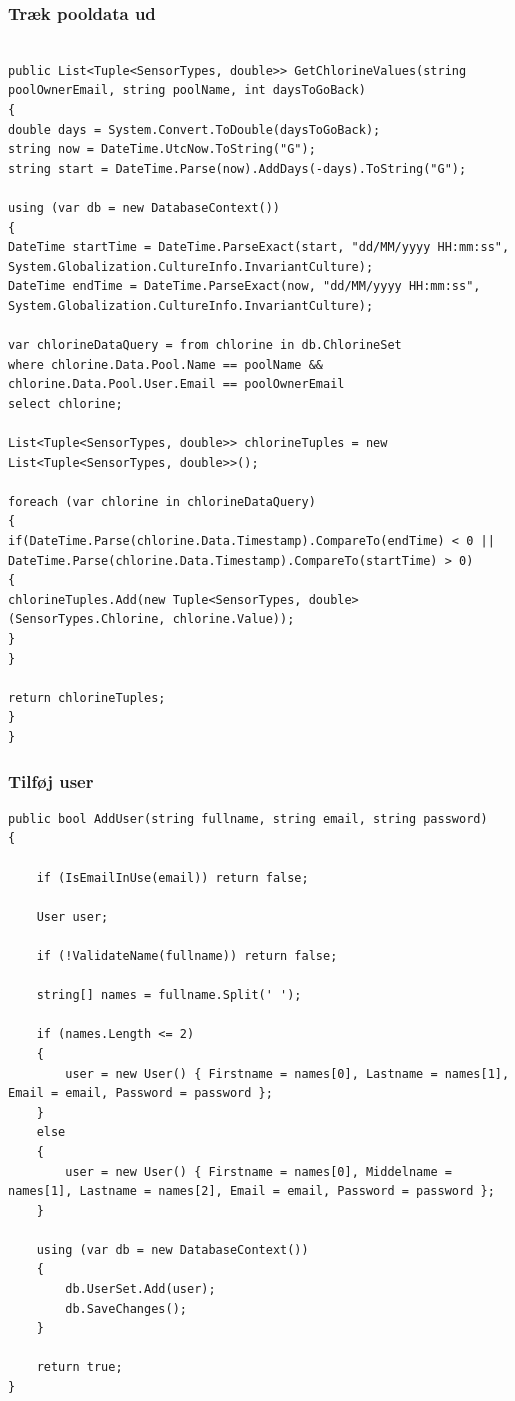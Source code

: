 \subsubsection{Træk pooldata ud}

\begin{lstlisting}[caption= GetChlorineData method, label=code:getChlorineData]

public List<Tuple<SensorTypes, double>> GetChlorineValues(string poolOwnerEmail, string poolName, int daysToGoBack)
{
double days = System.Convert.ToDouble(daysToGoBack);
string now = DateTime.UtcNow.ToString("G");
string start = DateTime.Parse(now).AddDays(-days).ToString("G");

using (var db = new DatabaseContext())
{   
DateTime startTime = DateTime.ParseExact(start, "dd/MM/yyyy HH:mm:ss", System.Globalization.CultureInfo.InvariantCulture);
DateTime endTime = DateTime.ParseExact(now, "dd/MM/yyyy HH:mm:ss", System.Globalization.CultureInfo.InvariantCulture);

var chlorineDataQuery = from chlorine in db.ChlorineSet
where chlorine.Data.Pool.Name == poolName && chlorine.Data.Pool.User.Email == poolOwnerEmail
select chlorine;

List<Tuple<SensorTypes, double>> chlorineTuples = new List<Tuple<SensorTypes, double>>();

foreach (var chlorine in chlorineDataQuery)
{
if(DateTime.Parse(chlorine.Data.Timestamp).CompareTo(endTime) < 0 ||
DateTime.Parse(chlorine.Data.Timestamp).CompareTo(startTime) > 0)
{
chlorineTuples.Add(new Tuple<SensorTypes, double>(SensorTypes.Chlorine, chlorine.Value));
}
}

return chlorineTuples;
}
}
\end{lstlisting}

\subsubsection{Tilføj user}

\begin{lstlisting}[]
public bool AddUser(string fullname, string email, string password)
{

	if (IsEmailInUse(email)) return false;

	User user;

	if (!ValidateName(fullname)) return false;

	string[] names = fullname.Split(' ');

	if (names.Length <= 2)
	{
		user = new User() { Firstname = names[0], Lastname = names[1], Email = email, Password = password };
	}
	else
	{
		user = new User() { Firstname = names[0], Middelname = names[1], Lastname = names[2], Email = email, Password = password };
	}

	using (var db = new DatabaseContext())
	{
		db.UserSet.Add(user);
		db.SaveChanges();
	}

	return true;
}
\end{lstlisting}





